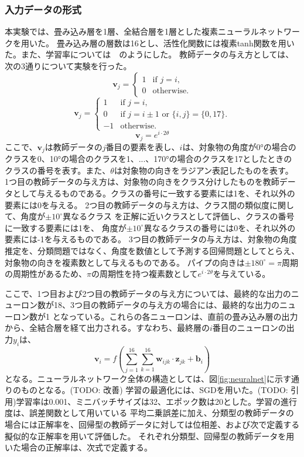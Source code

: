 \documentclass[11pt,a4paper,uplatex,draft]{ujarticle}
\begin{document}
  
  \subsubsection{入力データの形式}
  本実験では、畳み込み層を1層、全結合層を1層とした複素ニューラルネットワークを用いた。
  畳み込み層の層数は16とし、活性化関数には複素tanh関数を用いた。また、学習率については　のようにした。
  教師データの与え方としては、次の3通りについて実験を行った。
  \[
    \mathbf{v}_j =
    \begin{cases}
        1 & \text{if } j = i, \\
        0 & \text{otherwise}.
    \end{cases}
  \]
  \[
    \mathbf{v}_j =
    \begin{cases}
        1 & \text{if } j = i, \\
        0 & \text{if } j = i \pm 1 \text{ or } \{i, j\} = \{0, 17\}.\\
        -1 & \text{otherwise}.
    \end{cases}
  \]
  \[
    \mathbf{v}_j = e^{i\cdot2\theta}
  \]
  ここで、$\mathbf{v}_j$は教師データの$j$番目の要素を表し、$i$は、対象物の角度が0°の場合のクラスを0、10°の場合のクラスを1、...、170°の場合のクラスを17としたときの
  クラスの番号を表す。また、$\theta$は対象物の向きをラジアン表記したものを表す。
  1つ目の教師データの与え方は、対象物の向きをクラス分けしたものを教師データとして与えるものである。クラスの番号に一致する要素には1を、それ以外の要素には0を与える。
  2つ目の教師データの与え方は、クラス間の類似度に関して、角度が$\pm10^{\circ}$異なるクラス
  を正解に近いクラスとして評価し、クラスの番号に一致する要素には1を、 角度が$\pm10^{\circ}$異なるクラスの番号には0を、それ以外の要素には-1を与えるものである。
  3つ目の教師データの与え方は、対象物の角度推定を、分類問題ではなく、角度を数値として予測する回帰問題としてとらえ、対象物の向きを複素数として与えるものである。
  パイプの向きは$\pm180^{\circ} = \pi$周期の周期性があるため、$\pi$の周期性を持つ複素数として$e^{i\cdot2\theta}$を与えている。

  ここで、1つ目および2つ目の教師データの与え方については、最終的な出力のニューロン数が18、3つ目の教師データの与え方の場合には、最終的な出力のニューロン数が1
  となっている。これらの各ニューロンは、直前の畳み込み層の出力から、全結合層を経て出力される。すなわち、最終層の$i$番目のニューロンの出力$y_i$は、
  \[
    \mathbf{v}_i = f(\sum_{j=1}^{16} \sum_{k=1}^{16} \mathbf{w}_{ijk} \cdot \mathbf{z}_{jk} + \mathbf{b}_i)
  \]
  となる。ニューラルネットワーク全体の構造としては、図\ref{fig:neuralnet}に示す通りのものとなる。(TODO: 改善)
  学習の最適化には、SGDを用いた。(TODO: 引用)学習率は0.001、ミニバッチサイズは32、エポック数は20とした。学習の進行度は、誤差関数として用いている
  平均二乗誤差に加え、分類型の教師データの場合には正解率を、回帰型の教師データに対しては位相差、および次で定義する擬似的な正解率を用いて評価した。
  それぞれ分類型、回帰型の教師データを用いた場合の正解率は、次式で定義する。
\end{document}
